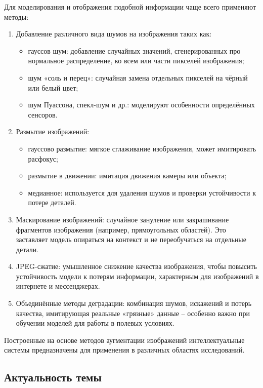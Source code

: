 Для моделирования и отображения подобной информации чаще всего применяют методы:

\begin{enumerate}
	\item Добавление различного вида шумов на изображения таких как:
	\begin{itemize}
	\item гауссов шум: добавление случайных значений, сгенерированных про нормальное распределение, ко всем или части пикселей изображения;
	\item шум «соль и перец»: случайная замена отдельных пикселей на чёрный или белый цвет;
	\item шум Пуассона, спекл-шум и др.: моделируют особенности определённых сенсоров.
	\end{itemize}
	\item Размытие изображений:
	\begin{itemize}
	\item гауссово размытие: мягкое сглаживание изображения, может имитировать расфокус;
	\item размытие в движении: имитация движения камеры или объекта;
	\item медианное: используется для удаления шумов и проверки устойчивости к потере деталей.
	\end{itemize}
	\item Маскирование изображений: случайное зануление или закрашивание фрагментов изображения (например, прямоугольных областей). Это заставляет модель опираться на контекст и не переобучаться на отдельные детали.
	\item JPEG-сжатие: умышленное снижение качества изображения, чтобы повысить устойчивость модели к потерям информации, характерным для изображений в интернете и мессенджерах.
	\item Объединённые методы деградации: комбинация шумов, искажений и потерь качества, имитирующая реальные «грязные» данные – особенно важно при обучении моделей для работы в полевых условиях.
\end{enumerate}

Построенные на основе методов аугментации изображений интеллектуальные системы предназначены для применения в различных областях исследований.

\subsection{Актуальность темы}

